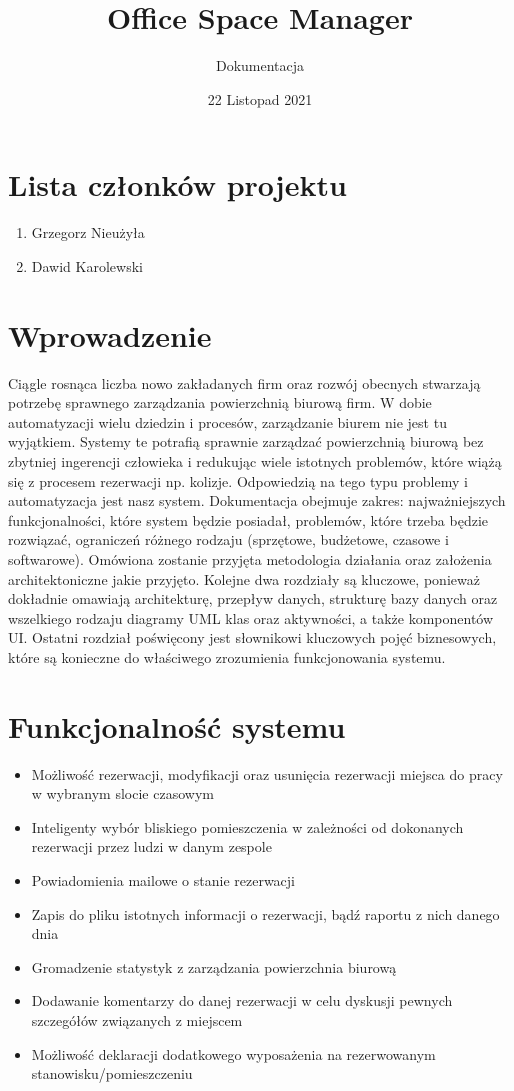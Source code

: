 \documentclass{article}
\title{Office Space Manager}
\author{Dokumentacja}
\date{22 Listopad 2021}
\begin{document}
\maketitle

\section{Lista członków projektu}
\begin{enumerate}
  \item Grzegorz Nieużyła
  \item Dawid Karolewski
\end{enumerate}


\section{Wprowadzenie}
Ciągle rosnąca liczba nowo zakładanych firm oraz rozwój obecnych stwarzają potrzebę sprawnego zarządzania powierzchnią biurową firm. W dobie automatyzacji wielu dziedzin i procesów, zarządzanie biurem nie jest tu wyjątkiem. Systemy te potrafią sprawnie zarządzać powierzchnią biurową bez zbytniej ingerencji człowieka i redukując wiele istotnych problemów, które wiążą się z procesem rezerwacji np. kolizje. Odpowiedzią na tego typu problemy i automatyzacja jest nasz system.
Dokumentacja obejmuje zakres: najważniejszych funkcjonalności, które system będzie posiadał, problemów, które trzeba będzie rozwiązać, ograniczeń różnego rodzaju (sprzętowe, budżetowe, czasowe i softwarowe). Omówiona zostanie przyjęta metodologia działania oraz założenia architektoniczne jakie przyjęto. Kolejne dwa rozdziały są kluczowe, ponieważ dokładnie omawiają architekturę, przepływ danych, strukturę bazy danych oraz wszelkiego rodzaju diagramy UML klas oraz aktywności, a także komponentów UI. Ostatni rozdział poświęcony jest słownikowi kluczowych pojęć biznesowych, które są konieczne do właściwego zrozumienia funkcjonowania systemu.


\section{Funkcjonalność systemu}
\begin{itemize}
  \item Możliwość rezerwacji, modyfikacji oraz usunięcia rezerwacji miejsca do pracy w wybranym slocie czasowym
  \item Inteligenty wybór bliskiego pomieszczenia w zależności od dokonanych rezerwacji przez ludzi w danym zespole
  \item Powiadomienia mailowe o stanie rezerwacji
  \item Zapis do pliku istotnych informacji o rezerwacji, bądź raportu z nich danego dnia
  \item Gromadzenie statystyk z zarządzania powierzchnia biurową
  \item Dodawanie komentarzy do danej rezerwacji w celu dyskusji pewnych szczegółów związanych z miejscem
  \item Możliwość deklaracji dodatkowego wyposażenia na rezerwowanym stanowisku/pomieszczeniu
\end{itemize}
\end{document}
